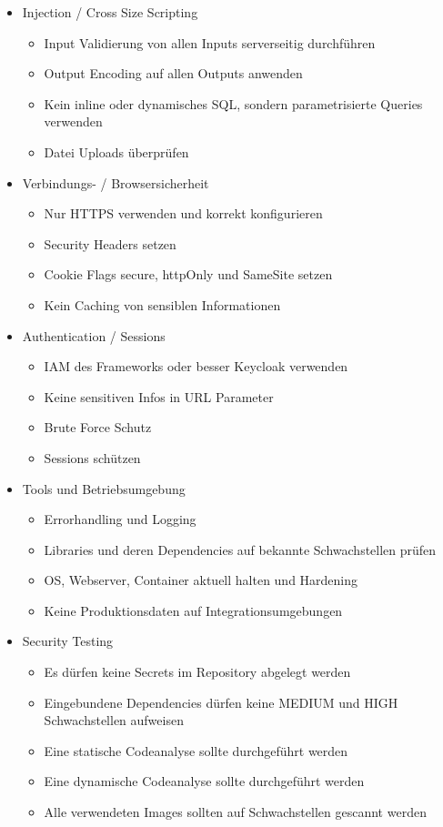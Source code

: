 \begin{itemize}
    \item{Injection / Cross Size Scripting}
    \begin{itemize}
        \item{Input Validierung von allen Inputs serverseitig durchführen}
        \item{Output Encoding auf allen Outputs anwenden}
        \item{Kein inline oder dynamisches SQL, sondern parametrisierte Queries verwenden}
        \item {Datei Uploads überprüfen}
    \end{itemize}
    \item Verbindungs- / Browsersicherheit
    \begin{itemize}
        \item{Nur HTTPS verwenden und korrekt konfigurieren}
        \item{Security Headers setzen}
        \item{Cookie Flags secure, httpOnly und SameSite setzen}
        \item{Kein Caching von sensiblen Informationen}
    \end{itemize}

    \newpage

    \item Authentication / Sessions
    \begin{itemize}
        \item{IAM des Frameworks oder besser Keycloak verwenden}
        \item{Keine sensitiven Infos in URL Parameter}
        \item{Brute Force Schutz}
        \item{ Sessions schützen}
    \end{itemize}
    \item Tools und Betriebsumgebung
    \begin{itemize}
        \item{Errorhandling und Logging}
        \item{Libraries und deren Dependencies auf bekannte Schwachstellen prüfen}
        \item{OS, Webserver, Container aktuell halten und Hardening}
        \item{Keine Produktionsdaten auf Integrationsumgebungen}
    \end{itemize}
    \item Security Testing
    \begin{itemize}
        \item{Es dürfen keine Secrets im Repository abgelegt werden}
        \item{Eingebundene Dependencies dürfen keine MEDIUM und HIGH Schwachstellen aufweisen}
        \item{Eine statische Codeanalyse sollte durchgeführt werden}
        \item{Eine dynamische Codeanalyse sollte durchgeführt werden}
        \item{Alle verwendeten Images sollten auf Schwachstellen gescannt werden}
    \end{itemize}
\end{itemize}

